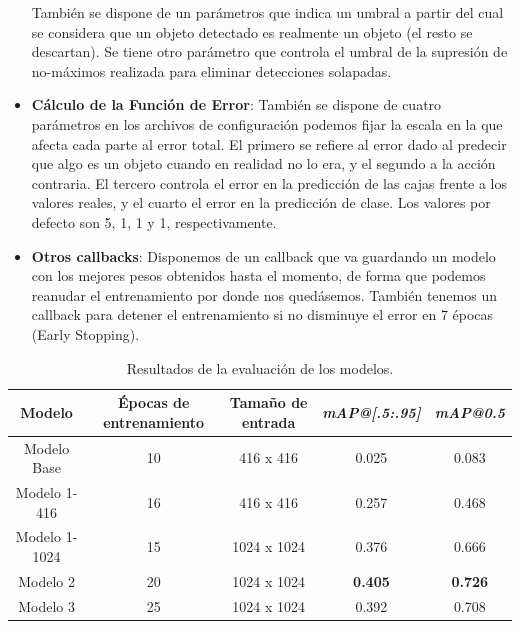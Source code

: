 \documentclass[10pt,twocolumn,letterpaper]{article}
\begin{document}
\begin{itemize}
También se dispone de un parámetros que indica un umbral a partir del cual se considera que un objeto detectado es realmente un objeto (el resto se descartan). Se tiene otro parámetro que controla el umbral de la supresión de no-máximos realizada para eliminar detecciones solapadas.
    \item \textbf{Cálculo de la Función de Error}: También se dispone de cuatro parámetros en los archivos de configuración podemos fijar la escala en la que afecta cada parte al error total. El primero se refiere al error dado al predecir que algo es un objeto cuando en realidad no lo era, y el segundo a la acción contraria. El tercero controla el error en la predicción de las cajas frente a los valores reales, y el cuarto el error en la predicción de clase. Los valores por defecto son 5, 1, 1 y 1, respectivamente.
    \item \textbf{Otros callbacks}: Disponemos de un callback que va guardando un modelo con los mejores pesos obtenidos hasta el momento, de forma que podemos reanudar el entrenamiento por donde nos quedásemos. También tenemos un callback para detener el entrenamiento si no disminuye el error en 7 épocas (Early Stopping).\\
\end{itemize}

\begin{table}[htb]
\centering
\begin{tabular}{c|c|c|c|c}
\textbf{Modelo}		& \textbf{Épocas de entrenamiento} & \textbf{Tamaño de entrada} & \textbf{\textit{mAP@[.5:.95]}} & \textbf{\textit{mAP@0.5}} \\
\hline
Modelo Base              & 10                              		     & 416 x 416                   	 & 0.025                     	  	  & 0.083          		 	    \\
Modelo 1-416           	& 16                              		     & 416 x 416                   	 & 0.257                     	  	  & 0.468           	 	    \\
Modelo 1-1024           & 15                              		     & 1024 x 1024                 	 & 0.376                   		  	  & 0.666             	 	    \\
Modelo 2        		& 20                               		     & 1024 x 1024                	 & \textbf{0.405}                 	  & \textbf{0.726}       	    \\
Modelo 3       		& 25                              		     & 1024 x 1024                       & 0.392                  		  	  & 0.708           	 	    \\
\end{tabular}
\caption{Resultados de la evaluación de los modelos.}
\label{tabla:resultados_evaluacion}
\end{table}
\end{document}
